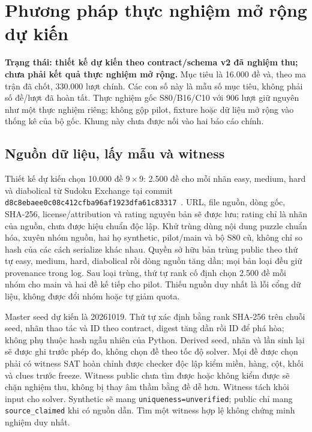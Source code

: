 \section{Phương pháp thực nghiệm mở rộng dự kiến}
\label{sec:expanded-methods-vi}
\textbf{Trạng thái: thiết kế dự kiến theo contract/schema v2 đã nghiệm thu;
chưa phải kết quả thực nghiệm mở rộng.}
Mục tiêu là 16.000 đề và, theo ma trận đã chốt, 330.000 lượt chính.
Các con số này là mẫu số mục tiêu, không phải số đề/lượt đã hoàn tất.
Thực nghiệm gốc S80/B16/C10 với 906 lượt giữ nguyên như một thực nghiệm riêng;
không gộp pilot, fixture hoặc dữ liệu mở rộng vào thống kê của bộ gốc.
Khung này chưa được nối vào hai báo cáo chính.

\subsection{Nguồn dữ liệu, lấy mẫu và witness}
Thiết kế dự kiến chọn 10.000 đề $9\times9$: 2.500 đề cho mỗi nhãn
easy, medium, hard và diabolical từ Sudoku Exchange tại commit
\texttt{d8c8ebaee0c08c412cfba96af1923dfa61c83317}~\cite{sudoku-exchange-data}.
URL, file nguồn, dòng gốc, SHA-256, license/attribution và rating nguyên bản
sẽ được lưu; rating chỉ là nhãn của nguồn, chưa được hiệu chuẩn độc lập.
Khử trùng dùng nội dung puzzle chuẩn hóa, xuyên nhóm nguồn, hai họ synthetic,
pilot/main và bộ S80 cũ, không chỉ so hash của các cách serialize khác nhau.
Quyền sở hữu bản trùng public theo thứ tự easy, medium, hard, diabolical rồi
dòng nguồn tăng dần; mọi bản loại đều giữ provenance trong log.
Sau loại trùng, thứ tự rank cố định chọn 2.500 đề mỗi nhóm cho main và hai đề
kế tiếp cho pilot. Thiếu nguồn duy nhất là lỗi cổng dữ liệu, không được đổi nhóm
hoặc tự giảm quota.

Master seed dự kiến là 20261019. Thứ tự xác định bằng rank SHA-256 trên chuỗi
seed, nhãn thao tác và ID theo contract, digest tăng dần rồi ID để phá hòa;
không phụ thuộc hash ngẫu nhiên của Python. Derived seed, nhãn và lần sinh lại
sẽ được ghi trước phép đo, không chọn đề theo tốc độ solver.
Mọi đề được chọn phải có witness SAT hoàn chỉnh được checker độc lập kiểm
miền, hàng, cột, khối và clues trước freeze. Witness public chưa tìm được hoặc
không kiểm được sẽ chặn nghiệm thu, không bị thay âm thầm bằng đề dễ hơn.
Witness tách khỏi input cho solver. Synthetic sẽ mang
\texttt{uniqueness=unverified}; public chỉ mang \texttt{source\_claimed} khi có
nguồn dẫn. Tìm một witness hợp lệ không chứng minh nghiệm duy nhất.

